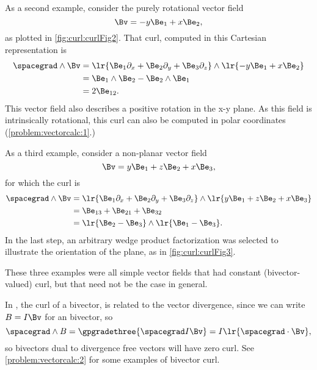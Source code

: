 As a second example, consider the purely rotational vector field
\begin{equation}\label{eqn:vectorcalc:1090}
\Bv = -y \Be_1 + x \Be_2,
\end{equation}
as plotted in \cref{fig:curl:curlFig2}.
That curl, computed in this Cartesian representation is
\begin{equation}\label{eqn:vectorcalc:1110}
\begin{aligned}
\spacegrad \wedge \Bv
&=
\lr{ \Be_1 \partial_x + \Be_2 \partial_y + \Be_3 \partial_z } \wedge \lr{ -y \Be_1 + x \Be_2 } \\
&=
\Be_1 \wedge \Be_2 - \Be_2 \wedge \Be_1 \\
&=
2 \Be_{12}.
\end{aligned}
\end{equation}
This vector field also describes a positive rotation in the x-y plane.
As this field is intrinsically rotational, this curl can also be computed in polar coordinates (\cref{problem:vectorcalc:1}.)

As a third example, consider a non-planar vector field
\begin{equation}\label{eqn:vectorcalc:1250}
\Bv = y \Be_1 + z \Be_2 + x \Be_3,
\end{equation}
for which the curl is
\begin{equation}\label{eqn:vectorcalc:1270}
\begin{aligned}
\spacegrad \wedge \Bv
&=
\lr{ \Be_1 \partial_x + \Be_2 \partial_y + \Be_3 \partial_z } \wedge
\lr{ y \Be_1 + z \Be_2 + x \Be_3 } \\
&=
\Be_{13} + \Be_{21} + \Be_{32} \\
&=
\lr{ \Be_2 - \Be_3 } \wedge \lr{ \Be_1 - \Be_3 }.
\end{aligned}
\end{equation}
In the last step, an arbitrary wedge product factorization was selected to illustrate the orientation of the plane, as in \cref{fig:curl:curlFig3}.

These three examples were all simple vector fields that had constant (bivector-valued) curl, but that need not be the case in general.

In , the curl of a bivector, is related to the vector divergence, since we can write \( B = I \Bv \) for an  bivector, so
\begin{equation}\label{eqn:vectorcalc:1170}
\spacegrad \wedge B = \gpgradethree{ \spacegrad I \Bv } = I \lr{ \spacegrad \cdot \Bv },
\end{equation}
so  bivectors dual to divergence free vectors will have zero curl.
See \cref{problem:vectorcalc:2} for some examples of bivector curl.

